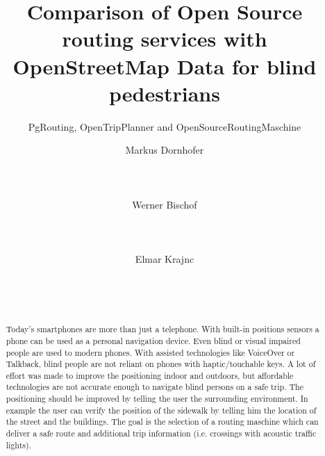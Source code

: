 \documentclass{sig-alternate}
\begin{document}
%

\title{Comparison of Open Source routing services with OpenStreetMap Data for blind pedestrians}
\subtitle{PgRouting, OpenTripPlanner and OpenSourceRoutingMaschine}


\author{
\alignauthor Markus Dornhofer\\
       \\
       \\
       \\
\alignauthor Werner Bischof\\
       \\
       \\
       \\
\alignauthor Elmar Krajnc\\
       \\
       \\
       \\
}

\maketitle

\begin{abstract}
Today's smartphones are more than just a telephone. With built-in positions sensors a phone can be used as a personal navigation device. Even blind or visual impaired people are used to modern phones. With assisted technologies like VoiceOver or Talkback, blind people are not reliant on phones with haptic/touchable keys. A lot of effort was made to improve the positioning indoor and outdoors, but affordable technologies are not accurate enough to navigate blind persons on a safe trip. The positioning should be improved by telling the user the surrounding environment. In example the user can verify the position of the sidewalk by telling him the location of the street and the buildings. The goal is the selection of a routing maschine which can deliver a safe route and additional trip information (i.e. crossings with acoustic traffic lights). 
\end{abstract}
\end{document}
